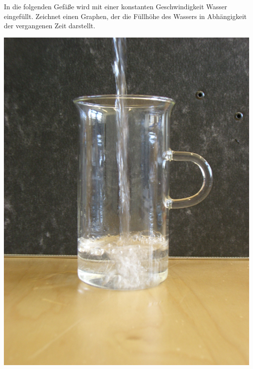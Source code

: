 \documentclass{cssheet}
\begin{document}
\newpage
\begin{aufgabe}[Füllgraphen]
	In die folgenden Gefäße wird mit einer konstanten \glqq{}Geschwindigkeit\grqq{} Wasser eingefüllt. Zeichnet einen Graphen, der die Füllhöhe des Wassers in Abhängigkeit der vergangenen Zeit darstellt.
	
	\begin{minipage}{.33\textwidth}
		\includegraphics[width=\linewidth]{Gefaess_A_1.jpg}
	\end{minipage}
	\begin{minipage}{.33\textwidth}

\end{minipage}
\end{aufgabe}
\end{document}
